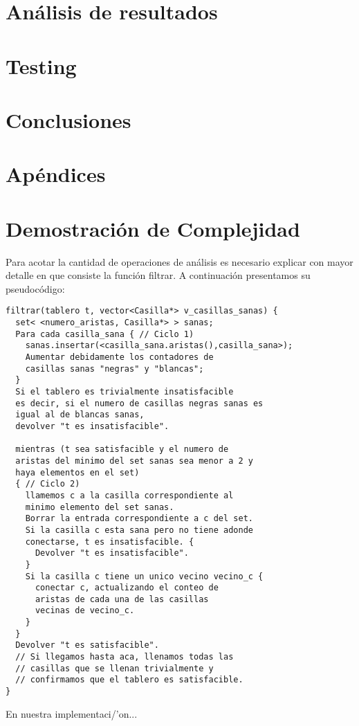 \documentclass[a4paper, 12pt] {article}
\begin{document}
\section*{An\'alisis de resultados}

\section*{Testing}

\begin{comment}
\begin{center}
\includegraphicx[width=0.7\textwidth]{Plots/Ej1-Complejidad.png}
\begin{center}
FiguraX
\end{center}
\end{center}
\end{comment}
\section*{Conclusiones}
\section*{Ap\'endices} 
\section{Demostraci\'on de Complejidad}\label{demo:comp_3}

Para acotar la cantidad de operaciones de an\'alisis es necesario explicar con mayor detalle en que consiste la funci\'on filtrar.
A continuaci\'on presentamos su pseudoc\'odigo:

\begin{verbatim}
filtrar(tablero t, vector<Casilla*> v_casillas_sanas) {
  set< <numero_aristas, Casilla*> > sanas;
  Para cada casilla_sana { // Ciclo 1)
    sanas.insertar(<casilla_sana.aristas(),casilla_sana>);
    Aumentar debidamente los contadores de 
    casillas sanas "negras" y "blancas";
  }
  Si el tablero es trivialmente insatisfacible 
  es decir, si el numero de casillas negras sanas es 
  igual al de blancas sanas,
  devolver "t es insatisfacible".
  
  mientras (t sea satisfacible y el numero de 
  aristas del minimo del set sanas sea menor a 2 y
  haya elementos en el set)
  { // Ciclo 2)
    llamemos c a la casilla correspondiente al
    minimo elemento del set sanas.
    Borrar la entrada correspondiente a c del set.
    Si la casilla c esta sana pero no tiene adonde 
    conectarse, t es insatisfacible. {
      Devolver "t es insatisfacible".
    }
    Si la casilla c tiene un unico vecino vecino_c {
      conectar c, actualizando el conteo de
      aristas de cada una de las casillas 
      vecinas de vecino_c.
    }
  }
  Devolver "t es satisfacible".
  // Si llegamos hasta aca, llenamos todas las
  // casillas que se llenan trivialmente y 
  // confirmamos que el tablero es satisfacible.
}

\end{verbatim}


En nuestra implementaci/'on...
\end{document}
